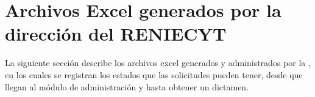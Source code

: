 %
%
%

\newpage
\section{Archivos Excel generados por la dirección del RENIECYT}
\label{appendix:Reportes:DireccionReniecyt}

La siguiente sección describe los archivos excel generados y administrados por la , en los cuales se registran los estados que las solicitudes pueden tener, desde que llegan al módulo de administración y hasta obtener un dictamen. \\

